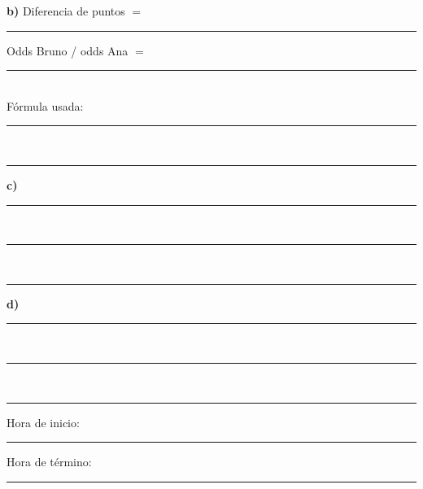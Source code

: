 \documentclass[11pt,a4paper]{article}
\begin{document}
\noindent\textbf{b)} Diferencia de puntos $=$ \rule{3cm}{0.4pt} \qquad Odds Bruno / odds Ana $=$ \rule{4cm}{0.4pt}\\[8pt]
Fórmula usada: \rule{13.5cm}{0.4pt}\\[8pt]
\rule{15.4cm}{0.4pt}

\bigskip
\noindent\textbf{c)} \rule{15cm}{0.4pt}\\[10pt]
\rule{15.4cm}{0.4pt}\\[10pt]
\rule{15.4cm}{0.4pt}

\bigskip
\noindent\textbf{d)} \rule{15cm}{0.4pt}\\[10pt]
\rule{15.4cm}{0.4pt}\\[10pt]
\rule{15.4cm}{0.4pt}

\vfill
\noindent\small Hora de inicio: \rule{2cm}{0.4pt} \quad Hora de término: \rule{2cm}{0.4pt}
\end{document}
